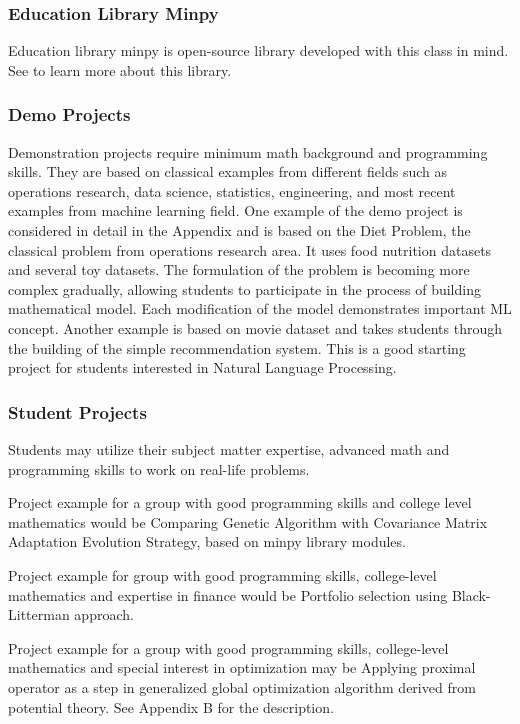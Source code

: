 {{{\subsubsection{Education Library Minpy}

Education library minpy is open-source library developed with this class in mind. See \cite{MP}  to learn more about this library.

\subsubsection{Demo Projects}

Demonstration projects require minimum math background and programming skills. They are based on classical examples from different fields such as operations research, data science, statistics, engineering, and most recent examples from machine learning field. 
One example of the demo project is considered in detail in the Appendix and is based on the Diet Problem, the classical problem from operations research area. It uses food nutrition datasets  and several toy datasets. The formulation of the problem is becoming more complex gradually, allowing students to participate in the process of building mathematical model. Each modification of the model demonstrates important  ML concept.
Another example is based on movie dataset and takes students through the building of the simple recommendation system. This is a good starting project  for students interested in Natural Language Processing. 

\subsubsection{Student  Projects}

Students may utilize their subject matter expertise, advanced math and programming skills to work on real-life problems. 

Project example for a group with good programming skills and  college level mathematics would be Comparing Genetic Algorithm with Covariance Matrix Adaptation Evolution Strategy, based on minpy library modules.

Project example for group with good programming skills, college-level mathematics and expertise in finance would be Portfolio selection using Black-Litterman approach. 

Project example for a group with good programming skills, college-level mathematics  and special interest in optimization may be Applying proximal operator as a step in generalized global optimization algorithm derived from potential theory. See Appendix B for the description.

}}}
